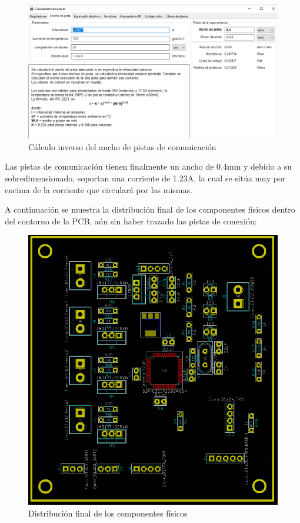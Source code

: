 \begin{figure}[H]
\centering 
\includegraphics[width=0.9\linewidth]{pictures/AnchoPistaResto.PNG}
\caption{Cálculo inverso del ancho de pistas de comunicación}
\label{fig:kdiagram}
\end{figure}

Las pistas de comunicación tienen finalmente un ancho de 0.4mm y debido a su sobredimensionado, soportan una corriente de 1.23A, la cual se sitúa muy por encima de la corriente que circulará por las mismas.

A continuación se muestra la distribución final de los componentes físicos dentro del contorno de la PCB, aún sin haber trazado las pistas de conexión:

\begin{figure}[H]
\centering 
\includegraphics[width=0.9\linewidth]{pictures/DistribucionFinal.PNG}
\caption{Distribución final de los componentes físicos}
\label{fig:kdiagram}
\end{figure}


